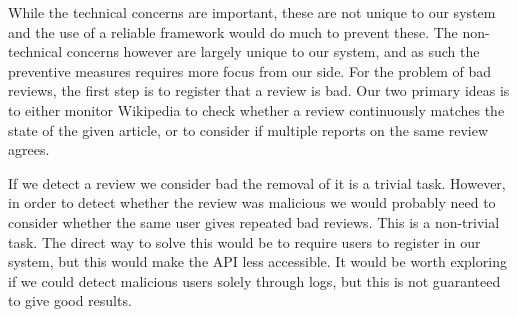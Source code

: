 While the technical concerns are important, these are not unique to our system and the use of a reliable framework would do much to prevent these. The non-technical concerns however are largely unique to our system, and as such the preventive measures requires more focus from our side. For the problem of bad reviews, the first step is to register that a review is bad. Our two primary ideas is to either monitor Wikipedia to check whether a review continuously matches the state of the given article, or to consider if multiple reports on the same review agrees.

If we detect a review we consider bad the removal of it is a trivial task. However, in order to detect whether the review was malicious we would probably need to consider whether the same user gives repeated bad reviews. This is a non-trivial task. The direct way to solve this would be to require users to register in our system, but this would make the API less accessible. It would be worth exploring if we could detect malicious users solely through logs, but this is not guaranteed to give good results.